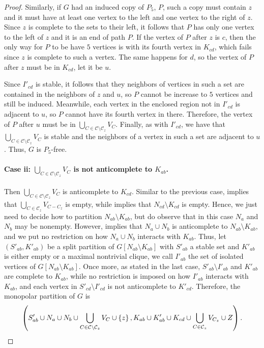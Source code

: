 \begin{proof}
    Similarly, if $G$ had an induced copy of $P_5$, $P$, such a copy must
    contain $z$ and it must have at least one vertex to the left and one vertex
    to the right of $z$. Since $z$ is complete to the sets to their left, it
    follows that $P$ has only one vertex to the left of $z$ and it is an end of
    path $P$. If the vertex of $P$ after $z$ is $c$, then the only way for $P$
    to be have $5$ vertices is with its fourth vertex in $K_{cd}$, which fails
    since $z$ is complete to such a vertex. The same happens for $d$, so the
    vertex of $P$ after $z$ must be in $K_{cd}$, let it be $u$.
    
    Since $I'_{cd}$ is stable, it follows that they neighbors of vertices in
    such a set are contained in the neighbors of $z$ and $u$, so $P$ cannot be
    increase to $5$ vertices and still be induced. Meanwhile, each vertex in the
    enclosed region not in $I'_{cd}$ is adjacent to $u$, so $P$ cannot have its
    fourth vertex in there. Therefore, the vertex of $P$ after $u$ must be in
    $\bigcup_{C\in\mathcal{C} \setminus \mathcal{C}_z} V_C$. Finally, as with
    $I'_{cd}$, we have that $\bigcup_{C\in\mathcal{C} \setminus \mathcal{C}_z}
    V_C$ is stable and the neighbors of a vertex in such a set are adjacent to
    $u$. Thus, $G$ is $P_5$-free.

    \paragraph{Case ii: $\bigcup_{C\in\mathcal{C}\setminus \mathcal{C}_z} V_C$
    is not anticomplete to $K_{ab}$.} Then $\bigcup_{C\in\mathcal{C}\setminus
    \mathcal{C}_z} V_C$ is anticomplete to $K_{cd}$. Similar to the previous
    case,  implies that $\bigcup_{C\in\mathcal{C}_z}
    V_{C-C_z}$ is empty, while  implies that
    $N_{cd}\setminus K_{cd}$ is empty. Hence, we just need to decide how to
    partition $N_{ab}\setminus K_{ab}$, but do observe that in this case $N_a$
    and $N_b$ may be nonempty. However,  implies
    that $N_a \cup N_b$ is anticomplete to $N_{ab} \setminus K_{ab}$, and we put
    no restriction on how $N_a \cup N_b$ interacts with $K_{ab}$. Thus, let
    $(S'_{ab},K'_{ab})$ be a split partition of $G[N_{ab}\setminus K_{ab}]$ with
    $S'_{ab}$ a stable set and $K'_{ab}$ is either empty or a maximal nontrivial
    clique, we call $I'_{ab}$ the set of isolated vertices of $G[N_{ab}\setminus
    K_{ab}]$. Once more, as stated in the last case, $S'_{ab}\setminus I'_{ab}$
    and $K'_{ab}$ are complete to $K_{ab}$, while no restriction is imposed on
    how $I'_{ab}$ interacts with $K_{ab}$, and each vertex in $S'_{cd}\setminus
    I'_{cd}$ is not anticomplete to $K'_{cd}$. Therefore, the monopolar
    partition of $G$ is
    \[
        \left(S'_{ab} \cup N_a \cup N_b \cup \bigcup_{C\in\mathcal{C}
        \setminus \mathcal{C}_z} V_C \cup \left\{z\right\} , 
        K_{ab} \cup K'_{ab} \cup K_{cd} \cup \bigcup_{C\in \mathcal{C}_z} 
        V_{C_z} \cup Z\right).
    \]


\end{proof}
